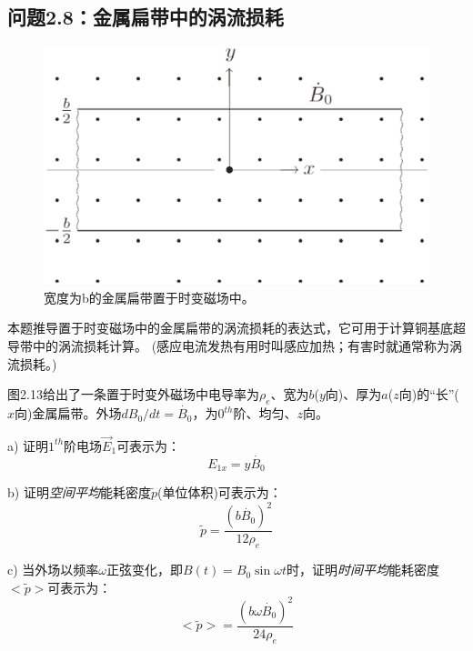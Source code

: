 

\subsection{问题2.8：金属扁带中的涡流损耗}
\begin{figure}[htbp]
  \centering
 \includegraphics[scale=0.4]{chpt2/figs/fig2.13.eps}
  \caption{宽度为b的金属扁带置于时变磁场中。}
\end{figure}

本题推导置于时变磁场中的金属扁带的涡流损耗的表达式，它可用于计算铜基底超导带中的涡流损耗计算。
(感应电流发热有用时叫感应加热；有害时就通常称为涡流损耗。)

图2.13给出了一条置于时变外磁场中电导率为$\rho_e$、宽为$b$($y$向)、厚为$a$($z$向)的``长''($x$向)金属扁带。外场$dB_0/dt=\dot{B_0}$，为$0^{th}$阶、均匀、$z$向。

a) 证明$1^{th}$阶电场$\vec{E}_1$可表示为：
\begin{equation}
E_{1x}=y\dot{B_0}
\end{equation}

b) 证明\textit{空间平均}能耗密度$\tilde{p}$(单位体积)可表示为：
\begin{equation}
\tilde{p}=\frac{(b\dot{B_0})^2}{12\rho_e}
\end{equation}

c) 当外场以频率$\omega$正弦变化，即$B(t)=B_0 \sin\omega t$时，证明\textit{时间平均}能耗密度$<\tilde{p}>$可表示为：
\begin{equation}
<\tilde{p}>=\frac{(b\omega\dot{B_0})^2}{24\rho_e}
\end{equation}


